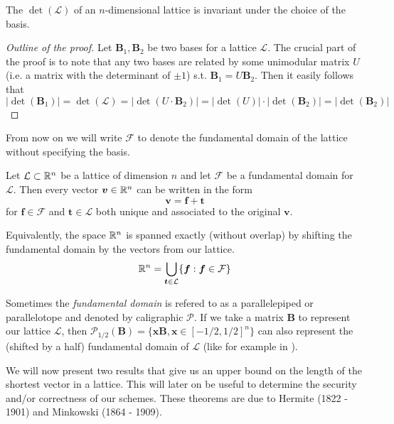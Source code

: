 \begin{lemma}
    The $\det (\mathcal{L})$ of an $n$-dimensional lattice is invariant under the choice of the basis.
\end{lemma}

\begin{proof}[Outline of the proof]
    Let $\bm{B}_1, \bm{B}_2$ be two bases for a lattice $\mathcal{L}$. The crucial part of the proof is to note that any two bases are related by some unimodular matrix $U$ (i.e. a matrix with the determinant of $\pm 1$) s.t. $\bm{B}_1 = U \bm{B}_2$. Then it easily follows that 
	\[| \det (\bm{B}_1) | = \det (\mathcal{L}) = | \det (U \cdot \bm{B}_2) | = | \det(U) | \cdot | \det(\bm{B}_2) | = | \det(\bm{B}_2)| \]
\end{proof}

From now on we will write $\mathcal{F}$ to denote the fundamental domain of the lattice without specifying the basis.

\begin{proposition}
    Let $\mathcal{L} \subset \mathbb{R}^n$ be a lattice of dimension $n$ and let $\mathcal{F}$ be a fundamental domain for $\mathcal{L}$. Then every vector $\boldsymbol{v} \in \mathbb{R}^n$ can be written in the form 
    $$\bm{v} = \bm{f} + \bm{t}$$
    for $\bm{f} \in \mathcal{F}$ and $\bm{t} \in \mathcal{L}$ both unique and associated to the original $\bm{v}$.
\end{proposition}

Equivalently, the space $\mathbb{R}^n$ is spanned exactly (without overlap) by shifting the fundamental domain by the vectors from our lattice.
$$ \mathbb{R}^n = \bigcup_{\boldsymbol{t} \in \mathcal{L}} \{\boldsymbol{f} : \boldsymbol{f} \in \mathcal{F} \}$$

\begin{remark}
    Sometimes the \textit{fundamental domain} is refered to as a parallelepiped or parallelotope and denoted by caligraphic $\mathcal{P}$. If we take a matrix $\bm{B}$ to represent our lattice $\mathcal{L}$, then $\mathcal{P}_{1/2}(\bm{B}) = \{\bm{x}\bm{B}, \bm{x} \in [-1/2, 1/2]^n \}$ can also represent the (shifted by a half) fundamental domain of $\mathcal{L}$ (like for example in \cite{gentry}).
\end{remark}
\iffalse
We will now present two results that give us an upper bound on the length of the shortest vector in a lattice. This will later on be useful to determine the security and/or correctness of our schemes. These theorems are due to Hermite (1822 - 1901) and Minkowski (1864 - 1909).

